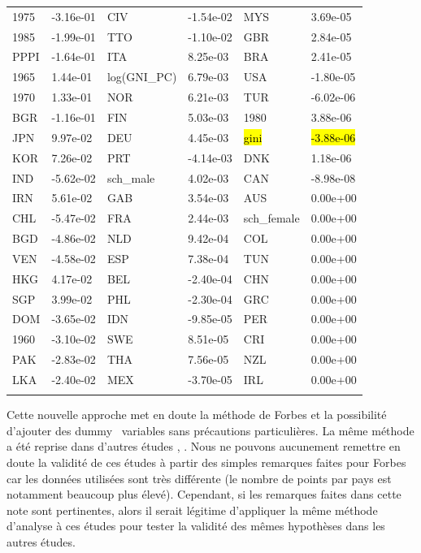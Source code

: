 \documentclass[11pt,a4paper]{article}
\begin{document}
\begin{center}
\begin{tabular}{ ll | ll | ll }
1975&-3.16e-01&     CIV& -1.54e-02&     MYS&  3.69e-05\\ 
1985&-1.99e-01&     TTO& -1.10e-02&     GBR&  2.84e-05\\ 
PPPI&-1.64e-01&     ITA&  8.25e-03&     BRA&  2.41e-05\\ 
1965& 1.44e-01&     log(GNI_PC)&    6.79e-03&   USA& -1.80e-05\\ 
1970& 1.33e-01&     NOR&  6.21e-03&     TUR& -6.02e-06\\ 
BGR& -1.16e-01&     FIN&  5.03e-03&     1980& 3.88e-06\\ 
JPN&  9.97e-02&     DEU&  4.45e-03&     \hl{gini}&\hl{-3.88e-06}\\ 
KOR&  7.26e-02&     PRT& -4.14e-03&     DNK&  1.18e-06\\ 
IND& -5.62e-02&     sch_male&     4.02e-03&     CAN& -8.98e-08\\ 
IRN&  5.61e-02&     GAB&  3.54e-03&     AUS&  0.00e+00\\ 
CHL& -5.47e-02&     FRA&  2.44e-03&     sch_female&     0.00e+00\\
BGD& -4.86e-02&     NLD&  9.42e-04&     COL&  0.00e+00\\ 
VEN& -4.58e-02&     ESP&  7.38e-04&     TUN&  0.00e+00\\ 
HKG&  4.17e-02&     BEL& -2.40e-04&     CHN&  0.00e+00\\ 
SGP&  3.99e-02&     PHL& -2.30e-04&     GRC&  0.00e+00\\ 
DOM& -3.65e-02&     IDN& -9.85e-05&     PER&  0.00e+00\\ 
1960&-3.10e-02&     SWE&  8.51e-05&     CRI&  0.00e+00\\ 
PAK& -2.83e-02&     THA&  7.56e-05&     NZL&  0.00e+00\\ 
LKA& -2.40e-02&     MEX& -3.70e-05&     IRL&  0.00e+00\\
\label{lasso}
\end{tabular}
\end{center}

Cette nouvelle approche met en doute la méthode de Forbes et la possibilité d'ajouter des \og dummy \fg~variables sans précautions particulières. La même méthode a été reprise dans d'autres études \cite{ostry}, \cite{OCDE}. Nous ne pouvons aucunement remettre en doute la validité de ces études à partir des simples remarques faites pour Forbes car les données utilisées sont très différente (le nombre de points par pays est notamment beaucoup plus élevé). Cependant, si les remarques faites dans cette note sont pertinentes, alors il serait légitime d'appliquer la même méthode d'analyse à ces études pour tester la validité des mêmes hypothèses dans les autres études. 
\end{document}
